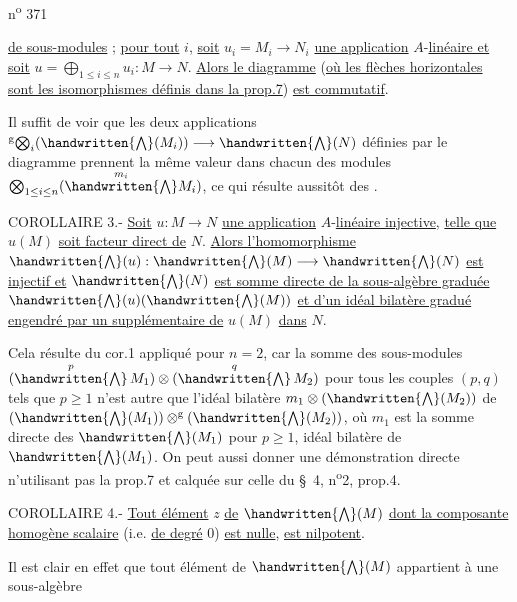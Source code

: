 n\textsuperscript{o} 371

\uline{de sous-modules} ; \uline{pour tout} $i$, \uline{soit} $u_i=M_i\to N_i$ \uline{une application} $A$-\uline{linéaire et soit} $u=\bigoplus_{1\leq i\leq n}u_i:M\longrightarrow N$. \uline{Alors le diagramme}
(\uline{où les flèches horizontales sont les isomorphismes définis dans la prop.7}) \uline{est commutatif}.

Il suffit de voir que les deux applications $ {}^{\mathrm g}\!\bigotimes_i(\handwritten{\bigwedge}(M_i))\longrightarrow \handwritten{\bigwedge}(N)$ définies par le diagramme prennent la même valeur dans chacun des modules $\bigotimes_{1\leq i\leq n}(\overset{m_i}{\handwritten{\bigwedge}}M_i)$, ce qui résulte aussitôt des .

COROLLAIRE 3.- \uline{Soit} $u:M\to N$ \uline{une application} $A$-\uline{linéaire injective}, \uline{telle que} $u(M)$ \uline{soit facteur direct de} $N$. \uline{Alors l'homomorphisme} $\handwritten{\bigwedge}(u):\handwritten{\bigwedge}(M)\longrightarrow \handwritten{\bigwedge}(N)$ \uline{est injectif et} $\handwritten{\bigwedge}(N)$ \uline{est somme directe de la sous-algèbre graduée} $\handwritten{\bigwedge}(u)(\handwritten{\bigwedge}(M))$ \uline{et d'un idéal bilatère gradué engendré par un supplémentaire de} $u(M)$ \uline{dans} $N$.

Cela résulte du cor.1 appliqué pour $n=2$, car la somme des sous-modules $(\overset{p}{\handwritten{\bigwedge}}\,M_1)\otimes(\overset{q}{\handwritten{\bigwedge}}\,M_2)$ pour tous les couples $(p,q)$ tels que $p\geq 1$ n'est autre que l'idéal bilatère $m_1\otimes(\handwritten{\bigwedge}(M_2))$ de $(\handwritten{\bigwedge}(M_1))\otimes^{\mathrm g}(\handwritten{\bigwedge}(M_2))$, où $m_1$ est la somme directe des $\handwritten{\bigwedge}(M_1)$ pour $p\geq 1$, idéal bilatère de $\handwritten{\bigwedge}(M_1)$. On peut aussi donner une démonstration directe n'utilisant pas la prop.7 et calquée sur celle du \S~4, n\textsuperscript{o}2, prop.4.

COROLLAIRE 4.- \uline{Tout élément} $z$ \uline{de} $\handwritten{\bigwedge}(M)$ \uline{dont la composante homogène scalaire} (i.e. \uline{de degré} 0) \uline{est nulle}, \uline{est nilpotent}.

Il est clair en effet que tout élément de $\handwritten{\bigwedge}(M)$ appartient à une sous-algèbre
